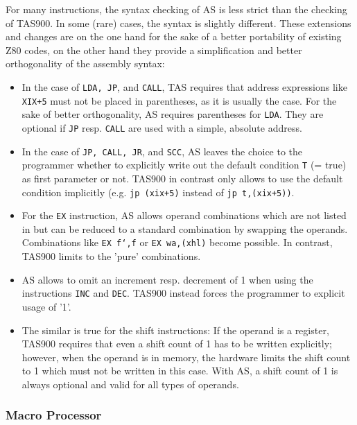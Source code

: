 \documentclass[12pt,twoside]{report}
\newcommand{\tty}[1]{{\tt #1}}
\newcommand{\asname}{{AS}}
\begin{document}
For many instructions, the syntax checking of \asname{} is less strict than
the checking of TAS900.  In some (rare) cases, the syntax is slightly
different.  These extensions and changes are on the one hand for the
sake of a better portability of existing Z80 codes, on the other hand
they provide a simplification and better orthogonality of the
assembly syntax:
\begin{itemize}
\item{In the case of \tty{LDA, JP}, and \tty{CALL}, TAS requires that address
      expressions like \tty{XIX+5} must not be placed in parentheses, as it
      is usually the case.  For the sake of better orthogonality, \asname{}
      requires parentheses for \tty{LDA}.  They are optional if \tty{JP} resp.
      \tty{CALL} are used with a simple, absolute address.}
\item{In the case of \tty{JP, CALL, JR}, and \tty{SCC}, \asname{} leaves the choice to the
      programmer whether to explicitly write out the default condition
      \tty{T} (= true) as first parameter or not.  TAS900 in contrast only
      allows to use the default condition implicitly (e.g. \tty{jp (xix+5)}
      instead of \tty{jp t,(xix+5))}.}
\item{For the \tty{EX} instruction, \asname{} allows operand combinations which are
      not listed in \cite{Tosh900} but can be reduced to a standard
      combination by swapping the operands.  Combinations like \tty{EX f`,f}
      or \tty{EX wa,(xhl)} become possible.  In contrast, TAS900 limits to
      the 'pure' combinations.}
\item{\asname{} allows to omit an increment resp. decrement of 1 when using the
      instructions \tty{INC} and \tty{DEC}.  TAS900 instead forces the programmer to
      explicit usage of '1'.}
\item{The similar is true for the shift instructions: If the operand is
      a register, TAS900 requires that even a shift count of 1 has to
      be written explicitly; however, when the operand is in memory,
      the hardware limits the shift count to 1 which must not be written
      in this case.  With \asname{}, a shift count of 1 is always optional and
      valid for all types of operands.}
\end{itemize}

\subsubsection{Macro Processor}
\end{document}
